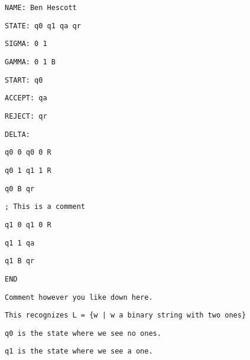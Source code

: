 \documentclass[12pt]{article}
\begin{document}
\pagebreak

\texttt {NAME: Ben Hescott}

\texttt{STATE: q0 q1 qa qr}

\texttt{SIGMA: 0 1}

\texttt{GAMMA: 0 1 B}

\texttt{START: q0}

\texttt{ACCEPT: qa}

\texttt{REJECT: qr}

\texttt{DELTA:}

\texttt{q0 0 q0 0 R}

\texttt{q0 1 q1 1 R}

\texttt{q0 B qr}

\texttt{; This is a comment}

\texttt{q1 0 q1 0 R}

\texttt{q1 1 qa}

\texttt{q1 B qr}

\texttt{END}

\vspace{2mm}

\texttt{Comment however you like down here.}

\texttt{This recognizes L = \{w | w a binary string with two ones\}}

\texttt{q0 is the state where we see no ones.}

\texttt{q1 is the state where we see a one.}
\end{document}
